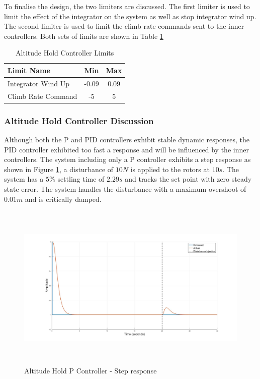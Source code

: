	 To finalise the design, the two limiters are discussed. The first limiter is used to limit the effect of the integrator on the system as well as stop integrator wind up. The second limiter is used to limit the climb rate commands sent to the inner controllers. Both sets of limits are shown in Table \ref{tab:AltitudeControllerLimits}
	 
	 \begin{table}[!]
	 	\centering
	 	\begin{tabular}{l | c | c |}
	 		Limit Name 						& Min & Max\\
	 		\hline\hline
	 		Integrator Wind Up 				& -0.09 & 0.09 \\
	 		Climb Rate Command 		    	& -5 & 5 \\
	 	\end{tabular}
	 	\caption{Altitude Hold Controller Limits}
	 	\label{tab:AltitudeControllerLimits}
	 \end{table}
	 
		 \subsubsection{Altitude Hold Controller Discussion}
		 Although both the P and PID controllers exhibit stable dynamic responses, the PID controller exhibited too fast a response and will be influenced by the inner controllers. The system including only a P controller exhibits a step response as shown in Figure \ref{IM_AltHoldStep}, a disturbance of $10N$ is applied to the rotors at $10s$. The system has a $5\%$ settling time of $2.29s$ and tracks the set point with zero steady state error. The system handles the disturbance with a maximum overshoot of $0.01m$ and is critically damped.
		 
		 \begin{figure}[H]
		 	\centering
		 	\includegraphics[height = 8cm]{../Design/Matlab/Controllers/altitude_step_p_no_dist.jpg}
		 	\caption{Altitude Hold P Controller -  Step response}
		 	\label{IM_AltHoldStep}
		 \end{figure}
		 
